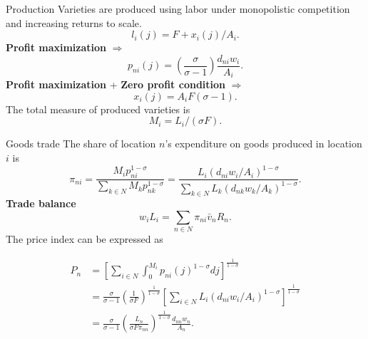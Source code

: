 \documentclass{beamer}
\begin{document}
\begin{frame}{Production}
	Varieties are produced using labor under monopolistic competition and increasing returns to scale.
	\begin{equation}
		l_i(j) = F + x_i(j)/A_i.
	\end{equation}
	\textbf{Profit maximization} $\Rightarrow$
	\begin{equation}
		p_{ni}(j)=\left(\frac{\sigma}{\sigma-1} \right)\frac{d_{ni}w_i}{A_i}.
	\end{equation}
	\textbf{Profit maximization} + \textbf{Zero profit condition} $\Rightarrow$
	\begin{equation}
		x_i(j) = A_iF(\sigma-1).
	\end{equation}
	The total measure of produced varieties is
	\begin{equation}
		M_i=L_i/(\sigma F).
	\end{equation}
\end{frame}
\begin{frame}{Goods trade}
	The share of location $n$'s expenditure on goods produced in location $i$ is
	\begin{equation}
		\pi_{ni} = \frac{M_ip_{ni}^{1-\sigma}}{\sum_{k\in N}M_kp_{nk}^{1-\sigma}}=\frac{L_i(d_{ni}w_i/A_i)^{1-\sigma}}{\sum_{k\in N}L_k(d_{nk}w_k/A_k)^{1-\sigma}}.
	\end{equation}
	\textbf{Trade balance}
	\begin{equation}
		w_iL_i = \sum_{n\in N}\pi_{ni}\bar{v}_nR_n.
	\end{equation}
	The price index can be expressed as
	\begin{small}
		\begin{equation}
			\begin{aligned}
				P_n &= \left[\sum_{i\in N}\int_0^{M_i}p_{ni}(j)^{1-\sigma} dj\right]^{\frac{1}{1-\sigma}} \\
				&= \frac{\sigma}{\sigma-1}\left(\frac{1}{\sigma F}\right)^{\frac{1}{1-\sigma}}\left[\sum_{i\in N}L_i(d_{ni}w_i/A_i)^{1-\sigma} \right]^{\frac{1}{1-\sigma}} \\
				&= \frac{\sigma}{\sigma-1}\left(\frac{L_n}{\sigma F\pi_{nn}}\right)^{\frac{1}{1-\sigma}}\frac{d_{nn}w_n}{A_n}.
			\end{aligned}
		\end{equation}
	\end{small}
\end{frame}
\end{document}

